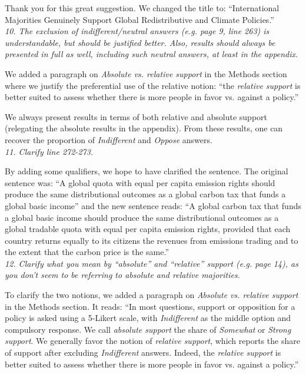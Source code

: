 \documentclass[12pt,english]{article}
\begin{document}
Thank you for this great suggestion. We changed the title to: ``International Majorities Genuinely Support Global Redistributive and Climate Policies.''
~\\

\textit{10. The exclusion of indifferent/neutral answers (e.g. page 9, line 263) is understandable, but should be justified better. Also, results should always be presented in full as well, including such neutral answers, at least in the appendix.} %

We added a paragraph on \textit{Absolute vs. relative support} in the Methods section where we justify the preferential use of the relative notion: ``the \textit{relative support} is better suited to assess whether there is more people in favor vs. against a policy.''

We always present results in terms of both relative and absolute support (relegating the absolute results in the appendix). From these results, one can recover the proportion of \textit{Indifferent} and \textit{Oppose} answers. 
~\\


\textit{11. Clarify line 272-273.}

By adding some qualifiers, we hope to have clarified the sentence. The original sentence was: ``A global quota with equal per capita emission rights should produce the same distributional outcomes as a global carbon tax that funds a global basic income'' and the new sentence reads: ``A global carbon tax that funds a global basic income should produce the same distributional outcomes as a global tradable quota with equal per capita emission rights, provided that each country returns equally to its citizens the revenues from emissions trading and to the extent that the carbon price is the same.''
~\\

\textit{12. Clarify what you mean by “absolute” and “relative” support (e.g. page 14), as you don’t seem to be referring to absolute and relative majorities.} %

To clarify the two notions, we added a paragraph on \textit{Absolute vs. relative support} in the Methods section. It reads: ``In most questions, support or opposition for a policy is asked using a 5-Likert scale, with \textit{Indifferent} as the middle option and compulsory response. We call \textit{absolute support} the share of \textit{Somewhat} or \textit{Strong support}. We generally favor the notion of \textit{relative support}, which reports the share of support after excluding \textit{Indifferent} answers. Indeed, the \textit{relative support} is better suited to assess whether there is more people in favor vs. against a policy.''
\end{document}
